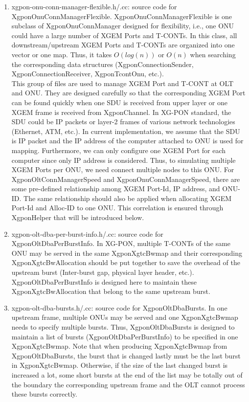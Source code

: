 \begin{enumerate}
 \item xgpon-onu-conn-manager-flexible.h/.cc: source code for {\color{red} XgponOnuConnManagerFlexible}. XgponOnuConnManagerFlexible 
is one subclass of XgponOnuConnManager designed for flexibility, i.e., one ONU could have a large number of XGEM Ports and T-CONTs. 
In this class, all downstream/upstream XGEM Ports and T-CONTs are organized into one vector or one map. Thus, 
it takes $O(log(n))$ or $O(n)$ when searching the corresponding data structures (XgponConnectionSender, XgponConnectionReceiver, XgponTcontOnu, etc.).
\\
{\color{blue} This group of files are used to manage XGEM Port and T-CONT at OLT and ONU. They are designed carefully 
so that the corresponding XGEM Port can be found quickly when one SDU is received from upper layer or one XGEM frame 
is received from XgponChannel. In XG-PON standard, the SDU could be IP packets or layer-2 frames of various network technologies 
(Ethernet, ATM, etc.). In current implementation, we assume that the SDU is IP packet and the IP address of the computer 
attached to ONU is used for mapping. Furthermore, we can only configure one XGEM Port for each computer since only 
IP address is considered. Thus, to simulating multiple XGEM Ports per ONU, we need connect multiple nodes to this ONU. 
For XgponOltConnManagerSpeed and XgponOnuConnManagerSpeed, there are some pre-defined relationship among XGEM Port-Id, 
IP address, and ONU-ID. The same relationship should also be applied when allocating XGEM Port-Id and Alloc-ID to one ONU. 
This correlation is ensured through XgponHelper that will be introduced below.}
\vspace{0.3in}



 \item xgpon-olt-dba-per-burst-info.h/.cc: source code for {\color{red} XgponOltDbaPerBurstInfo}.  In XG-PON, 
multiple T-CONTs of the same ONU may be served in the same XgponXgtcBwmap and their corresponding XgponXgtcBwAllocation 
should be put together to save the overhead of the upstream burst (Inter-burst gap, physical layer header, etc.). 
XgponOltDbaPerBurstInfo is designed here to maintain these XgponXgtcBwAllocation that belong to the same upstream burst.

 \item xgpon-olt-dba-bursts.h/.cc: source code for {\color{red} XgponOltDbaBursts}. In one upstream frame, 
multiple ONUs may be served and one XgponXgtcBwmap needs to specify multiple bursts. Thus, XgponOltDbaBursts 
is designed to maintain a list of bursts (XgponOltDbaPerBurstInfo) to be specified in one XgponXgtcBwmap. 
Note that when producing XgponXgtcBwmap from XgponOltDbaBursts, the burst that is changed lastly must be 
the last burst in XgponXgtcBwmap. Otherwise, if the size of the last changed burst is increased a lot, 
some short bursts at the end of the list may be totally out of the boundary the corresponding upstream frame 
and the OLT cannot process these bursts correctly.


\end{enumerate}
